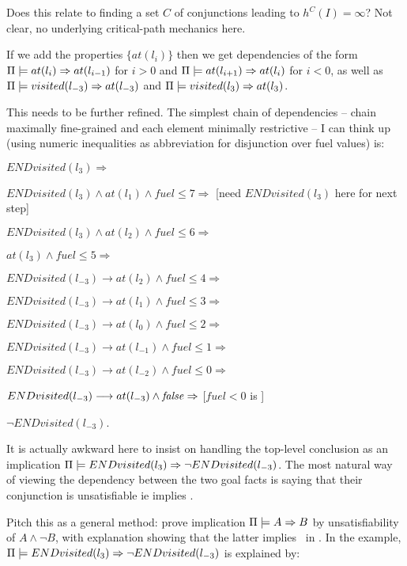 Does this relate to finding a set $C$ of conjunctions leading to
$h^C(I) = \infty$? Not clear, no underlying critical-path mechanics
here.

If we add the properties $\{at(l_i)\}$ then we get dependencies of the
form $\Pi \models at(l_i) \Rightarrow at(l_{i-1})$ for $i > 0$ and
$\Pi \models at(l_{i+1}) \Rightarrow at(l_{i})$ for $i < 0$, as well as
$\Pi \models visited(l_{-3}) \Rightarrow at(l_{-3})$ and
$\Pi \models visited(l_{3}) \Rightarrow at(l_{3})$.

This needs to be further refined. The simplest chain of dependencies
-- chain maximally fine-grained and each element minimally restrictive
-- I can think up (using numeric inequalities as abbreviation for
disjunction over fuel values) is: 

$END visited(l_{3}) \Rightarrow$ 

$END visited(l_{3}) \wedge at(l_{1}) \wedge fuel \leq 7 \Rightarrow$
[need $END visited(l_{3})$ here for next step]

$END visited(l_{3}) \wedge at(l_{2}) \wedge fuel \leq 6 \Rightarrow$

$at(l_{3}) \wedge fuel \leq 5 \Rightarrow$ 

$END visited(l_{-3}) \longrightarrow at(l_{2}) \wedge fuel \leq 4
\Rightarrow$ 

$END visited(l_{-3}) \longrightarrow at(l_{1}) \wedge fuel \leq 3
\Rightarrow$ 

$END visited(l_{-3}) \longrightarrow at(l_{0}) \wedge
fuel \leq 2 \Rightarrow$ 

$END visited(l_{-3}) \longrightarrow at(l_{-1}) \wedge fuel \leq 1
\Rightarrow$

$END visited(l_{-3}) \longrightarrow at(l_{-2}) \wedge fuel \leq 0
\Rightarrow$

$END visited(l_{-3}) \longrightarrow at(l_{-3}) \wedge \mathit{false}
\Rightarrow$ [$fuel < 0$ is \false]

$\neg END visited(l_{-3})$.

It is actually awkward here to insist on handling the top-level
conclusion as an implication $\Pi \models END visited(l_3) \Rightarrow \neg
  END visited(l_{-3})$. The most natural way of viewing the
dependency between the two goal facts is saying that their conjunction
is unsatisfiable ie implies \false.

Pitch this as a general method: prove implication
$\Pi \models A \Rightarrow B$ by unsatisfiability of $A \wedge \neg B$,
with explanation showing that the latter implies \false\ in \plans. In
the example, $\Pi \models END visited(l_{3}) \Rightarrow \neg END
  visited(l_{-3})$ is explained by:

